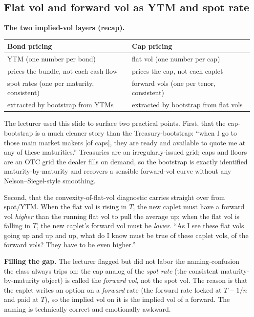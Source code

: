 \subsection{Flat vol and forward vol as YTM and spot rate}\label{L7-sec:flatvfwd-recap}

\begin{keyblock}
\textbf{The two implied-vol layers (recap).}
\begin{center}
\begin{tabular}{l|l}
\textbf{Bond pricing} & \textbf{Cap pricing} \\
\hline
YTM (one number per bond) & flat vol (one number per cap) \\
prices the bundle, not each cash flow & prices the cap, not each caplet \\
spot rates (one per maturity, consistent) & forward vols (one per tenor, consistent) \\
extracted by bootstrap from YTMs & extracted by bootstrap from flat vols \\
\end{tabular}
\end{center}
\end{keyblock}

The lecturer used this slide to surface two practical points.
First, that the cap-bootstrap is a much cleaner story than the
Treasury-bootstrap: ``when I go to those main market makers [of caps],
they are ready and available to quote me at any of these maturities.''
Treasuries are an irregularly-issued grid; caps and floors are an OTC
grid the dealer fills on demand, so the bootstrap is exactly identified
maturity-by-maturity and recovers a sensible forward-vol curve without
any Nelson--Siegel-style smoothing.

Second, that the convexity-of-flat-vol diagnostic carries straight
over from spot/YTM. When the flat vol is rising in $T$, the new caplet
must have a forward vol \emph{higher} than the running flat vol to pull
the average up; when the flat vol is falling in $T$, the new caplet's
forward vol must be \emph{lower}. ``As I see these flat vols going up
and up and up, what do I know must be true of these caplet vols, of the
forward vols? They have to be even higher.''

\begin{tipblock}
\textbf{Filling the gap.} The lecturer flagged but did not labor the
naming-confusion the class always trips on: the cap analog of the
\emph{spot rate} (the consistent maturity-by-maturity object) is called
the \emph{forward vol}, not the spot vol. The reason is that the
caplet writes an option on a \emph{forward} rate (the forward rate
locked at $T - 1/n$ and paid at $T$), so the implied vol on it is the
implied vol of a forward. The naming is technically correct and
emotionally awkward.
\end{tipblock}

